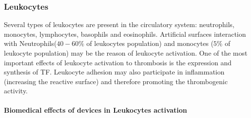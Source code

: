 \documentclass[%
 nofootinbib,
 amsmath,amssymb,
 aps,
 pra,
]{revtex4-1}
\begin{document}
\subsubsection{Leukocytes}
Several types of leukocytes are present in the circulatory system: neutrophils, monocytes, lymphocytes, basophils and eosinophils. Artificial surfaces interaction with Neutrophils($40-60 \%$ of leukocytes population) and monocytes ($5 \%$ of leukocyte population)  may be the reason of leukocyte activation. One of the most important effects of leukocyte activation to thrombosis is the expression and synthesis of TF. Leukocyte adhesion may also participate in inflammation (increasing the reactive surface) and therefore promoting the thrombogenic activity.\\
\paragraph{Biomedical effects of devices in Leukocytes activation}
\end{document}
